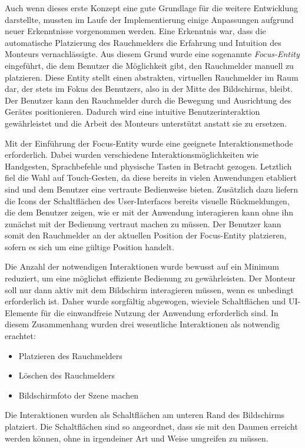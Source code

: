 Auch wenn dieses erste Konzept eine gute Grundlage für die weitere Entwicklung darstellte, mussten im Laufe der Implementierung einige Anpassungen aufgrund neuer Erkenntnisse vorgenommen werden. Eine Erkenntnis war, dass die automatische Platzierung des Rauchmelders die Erfahrung und Intuition des Monteurs vernachlässigte. Aus diesem Grund wurde eine sogenannte \emph{Focus-Entity} eingeführt, die dem Benutzer die Möglichkeit gibt, den Rauchmelder manuell zu platzieren. Diese Entity stellt einen abstrakten, virtuellen Rauchmelder im Raum dar, der stets im Fokus des Benutzers, also in der Mitte des Bildschirms, bleibt. Der Benutzer kann den Rauchmelder durch die Bewegung und Ausrichtung des Gerätes positionieren. Dadurch wird eine intuitive Benutzerinteraktion gewährleistet und die Arbeit des Monteurs unterstützt anstatt sie zu ersetzen.

Mit der Einführung der Focus-Entity wurde eine geeignete Interaktionsmethode erforderlich. Dabei wurden verschiedene Interaktionsmöglichkeiten wie Handgesten, Sprachbefehle und physische Tasten in Betracht gezogen. Letztlich fiel die Wahl auf Touch-Gesten, da diese bereits in vielen Anwendungen etabliert sind und dem Benutzer eine vertraute Bedienweise bieten. Zusätzlich dazu liefern die Icons der Schaltflächen des User-Interfaces bereits visuelle Rückmeldungen, die dem Benutzer zeigen, wie er mit der Anwendung interagieren kann ohne ihn zunächst mit der Bedienung vertraut machen zu müssen. Der Benutzer kann somit den Rauchmelder an der aktuellen Position der Focus-Entity platzieren, sofern es sich um eine gültige Position handelt.

Die Anzahl der notwendigen Interaktionen wurde bewusst auf ein Minimum reduziert, um eine möglichst effiziente Bedienung zu gewährleisten. Der Monteur soll nur dann aktiv mit dem Bildschirm interagieren müssen, wenn es unbedingt erforderlich ist. Daher wurde sorgfältig abgewogen, wieviele Schaltflächen und UI-Elemente für die einwandfreie Nutzung der Anwendung erforderlich sind. In diesem Zusammenhang wurden drei wesentliche Interaktionen als notwendig erachtet:

\begin{itemize}
    \item Platzieren des Rauchmelders
    \item Löschen des Rauchmelders
    \item Bildschirmfoto der Szene machen
\end{itemize}

Die Interaktionen wurden als Schaltflächen am unteren Rand des Bildschirms platziert. Die Schaltflächen sind so angeordnet, dass sie mit den Daumen erreicht werden können, ohne in irgendeiner Art und Weise umgreifen zu müssen. 

